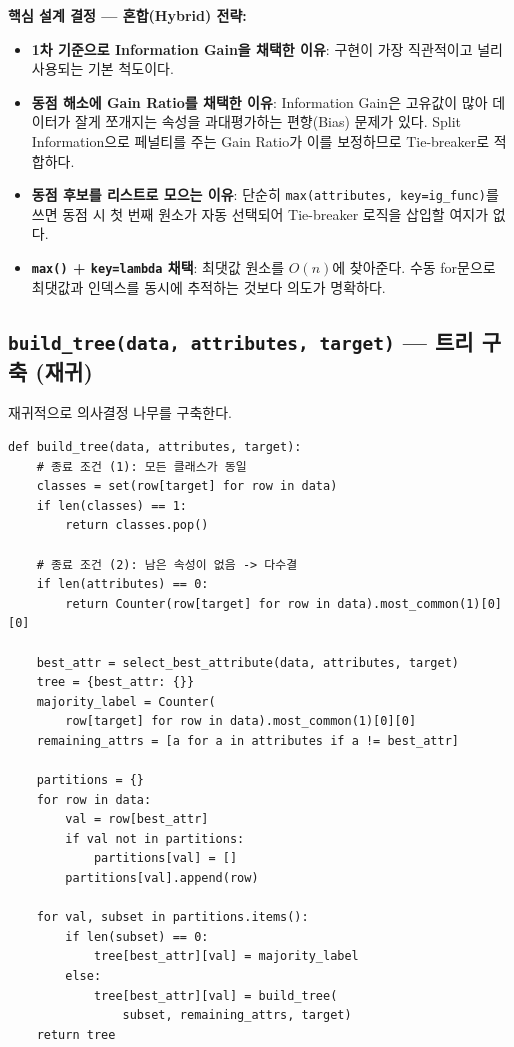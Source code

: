 \documentclass[12pt, a4paper]{article}
\begin{document}
\noindent\textbf{핵심 설계 결정 --- 혼합(Hybrid) 전략:}
\begin{itemize}
    \item \textbf{1차 기준으로 Information Gain을 채택한 이유}: 구현이 가장 직관적이고 널리 사용되는 기본 척도이다.
    \item \textbf{동점 해소에 Gain Ratio를 채택한 이유}: Information Gain은 고유값이 많아 데이터가 잘게 쪼개지는 속성을 과대평가하는 편향(Bias) 문제가 있다. Split Information으로 페널티를 주는 Gain Ratio가 이를 보정하므로 Tie-breaker로 적합하다.
    \item \textbf{동점 후보를 리스트로 모으는 이유}: 단순히 \texttt{max(attributes, key=ig\_func)}를 쓰면 동점 시 첫 번째 원소가 자동 선택되어 Tie-breaker 로직을 삽입할 여지가 없다.
    \item \textbf{\texttt{max()} + \texttt{key=lambda} 채택}: 최댓값 원소를 $O(n)$에 찾아준다. 수동 for문으로 최댓값과 인덱스를 동시에 추적하는 것보다 의도가 명확하다.
\end{itemize}


\subsection{\texttt{build\_tree(data, attributes, target)} --- 트리 구축 (재귀)}

재귀적으로 의사결정 나무를 구축한다.

\begin{verbatim}
def build_tree(data, attributes, target):
    # 종료 조건 (1): 모든 클래스가 동일
    classes = set(row[target] for row in data)
    if len(classes) == 1:
        return classes.pop()

    # 종료 조건 (2): 남은 속성이 없음 -> 다수결
    if len(attributes) == 0:
        return Counter(row[target] for row in data).most_common(1)[0][0]

    best_attr = select_best_attribute(data, attributes, target)
    tree = {best_attr: {}}
    majority_label = Counter(
        row[target] for row in data).most_common(1)[0][0]
    remaining_attrs = [a for a in attributes if a != best_attr]

    partitions = {}
    for row in data:
        val = row[best_attr]
        if val not in partitions:
            partitions[val] = []
        partitions[val].append(row)

    for val, subset in partitions.items():
        if len(subset) == 0:
            tree[best_attr][val] = majority_label
        else:
            tree[best_attr][val] = build_tree(
                subset, remaining_attrs, target)
    return tree
\end{verbatim}
\end{document}
